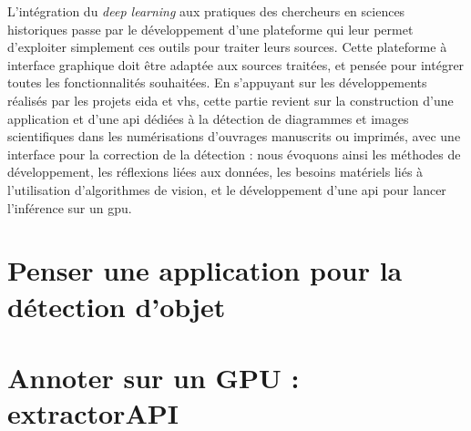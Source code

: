\documentclass[a4paper,12pt,twoside]{book}
\newcommand{\api}{\gls{api}\xspace}
\newcommand{\eida}{\gls{eida}\xspace}
\newcommand{\gpu}{\gls{gpu}\xspace}
\newcommand{\vhs}{\gls{vhs}\xspace}
\begin{document}
        L'intégration du \textit{deep learning} aux pratiques des chercheurs en sciences historiques passe par le développement d'une plateforme qui leur permet d'exploiter simplement ces outils pour traiter leurs sources. Cette plateforme à interface graphique doit être adaptée aux sources traitées, et pensée pour intégrer toutes les fonctionnalités souhaitées. En s'appuyant sur les développements réalisés par les projets \eida et \vhs, cette partie revient sur la construction d'une application  et d'une \api dédiées à la détection de diagrammes et images scientifiques dans les numérisations d'ouvrages manuscrits ou imprimés, avec une interface pour la correction de la détection : nous évoquons ainsi les méthodes de développement, les réflexions liées aux données, les besoins matériels liés à l'utilisation d'algorithmes de vision, et le développement d'une \api pour lancer l'inférence sur un \gpu. 
         
                \section{\label{detectionApp}Penser une application pour la détection d'objet}
                    
            
                \section{Annoter sur un GPU : extractorAPI}
                    
        \\
        
\end{document}
